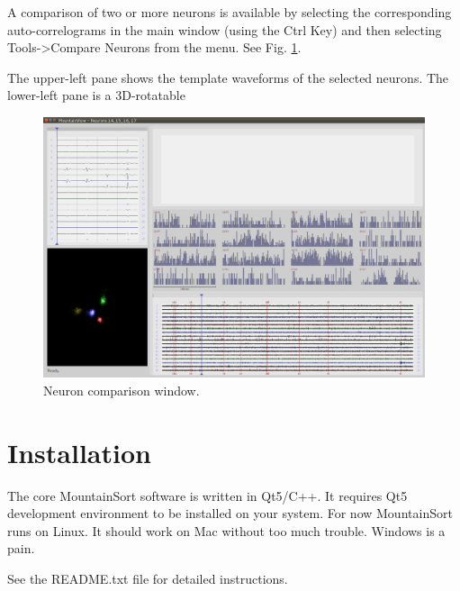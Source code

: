 \documentclass[hidelinks,10pt]{article}
\begin{document}
A comparison of two or more neurons is available by selecting the corresponding auto-correlograms in the main window (using the Ctrl Key) and then selecting Tools->Compare Neurons from the menu. See Fig. \ref{fig:mountainview_compare_window}.

The upper-left pane shows the template waveforms of the selected neurons. The lower-left pane is a 3D-rotatable 

\begin{figure}[!h]
\centering
\includegraphics[width=6in]{images/mountainview_compare_window.png}
\caption{
Neuron comparison window.
}
\label{fig:mountainview_compare_window}
\end{figure}



\section {Installation}

The core MountainSort software is written in Qt5/C++. It requires Qt5 development environment to be installed on your system. For now MountainSort runs on Linux. It should work on Mac without too much trouble. Windows is a pain.

See the README.txt file for detailed instructions.
\end{document}
